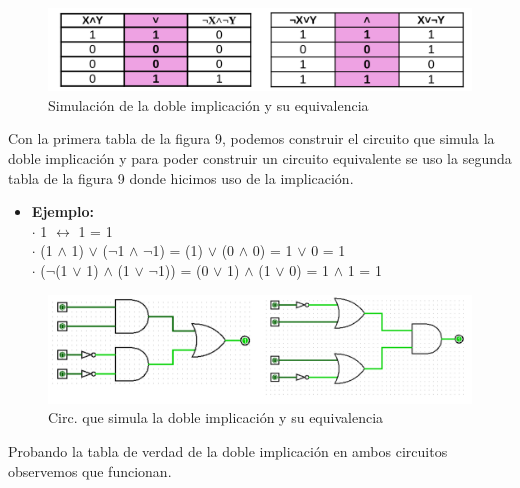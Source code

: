 \documentclass[11pt,letterpaper]{article}
\begin{document}
\begin{itemize}
\begin{figure}[h]
		\includegraphics[scale=0.40]{DIyE.png}
		\caption{Simulación de la doble implicación y su equivalencia}
	\end{figure}

	Con la primera tabla de la figura 9, podemos construir el circuito que simula la doble implicación y para poder construir un circuito equivalente se uso la segunda tabla de la figura 9 donde hicimos uso de la implicación.
	
	\begin{itemize}
		\item \textbf{Ejemplo:}\\
		$\cdot$ 1 $\leftrightarrow$ 1 = 1\\
		$\cdot$ (1 $\land$ 1) $\lor$ ($\neg$1 $\land$ $\neg$1) = (1) $\lor$ (0 $\land$ 0) = 1 $\lor$ 0 = 1\\
		$\cdot$ ($\neg$(1 $\lor$ 1) $\land$ (1 $\lor$ $\neg$1)) = (0 $\lor$ 1) $\land$ (1 $\lor$ 0) = 1 $\land$ 1 = 1
	\end{itemize}

	\begin{figure}[h]
		\centering
		\includegraphics[scale=0.40]{CircDI.png}
		\caption{Circ. que simula la doble implicación y su equivalencia}
	\end{figure}
	
	Probando la tabla de verdad de la doble implicación en ambos circuitos observemos que funcionan.
	

\end{itemize}
\end{document}
